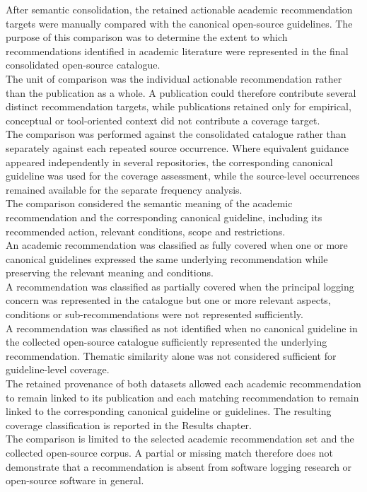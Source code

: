 After semantic consolidation, the retained actionable academic recommendation
targets were manually compared with the canonical open-source guidelines. The
purpose of this comparison was to determine the extent to which recommendations
identified in academic literature were represented in the final consolidated
open-source catalogue.
\\
The unit of comparison was the individual actionable recommendation rather than the
publication as a whole. A publication could therefore contribute several distinct
recommendation targets, while publications retained only for empirical, conceptual
or tool-oriented context did not contribute a coverage target.
\\
The comparison was performed against the consolidated catalogue rather than
separately against each repeated source occurrence. Where equivalent guidance
appeared independently in several repositories, the corresponding canonical
guideline was used for the coverage assessment, while the source-level occurrences
remained available for the separate frequency analysis.
\\
The comparison considered the semantic meaning of the academic recommendation and
the corresponding canonical guideline, including its recommended action, relevant
conditions, scope and restrictions.
\\
An academic recommendation was classified as fully covered when one or
more canonical guidelines expressed the same underlying recommendation while
preserving the relevant meaning and conditions.
\\
A recommendation was classified as partially covered when the principal
logging concern was represented in the catalogue but one or more relevant aspects,
conditions or sub-recommendations were not represented sufficiently.
\\
A recommendation was classified as not identified when no canonical
guideline in the collected open-source catalogue sufficiently represented the
underlying recommendation. Thematic similarity alone was not considered sufficient
for guideline-level coverage.
\\
The retained provenance of both datasets allowed each academic recommendation to
remain linked to its publication and each matching recommendation to remain linked
to the corresponding canonical guideline or guidelines. The resulting coverage
classification is reported in the Results chapter.
\\
The comparison is limited to the selected academic recommendation set and the
collected open-source corpus. A partial or missing match therefore does not
demonstrate that a recommendation is absent from software logging research or
open-source software in general.
